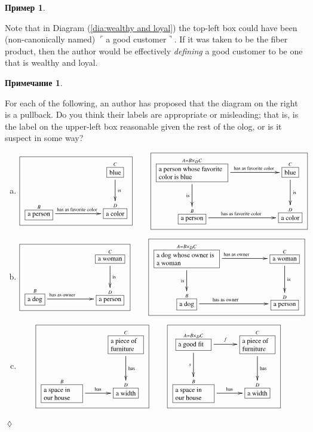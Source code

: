 \documentclass[a4paper]{book}
\def\tn{\textnormal}
\def\hsp{\hspace{.3in}}
\def\rr{\raggedright}
\newcommand{\LA}[2]{\ar[#1]^-{\tn {#2}}}
\newcommand{\LAL}[2]{\ar[#1]_-{\tn {#2}}}
\newcommand{\obox}[3]{\stackrel{#1}{\fbox{\parbox{#2}{#3}}}}
\newcommand{\smbox}[2]{\stackrel{#1}{\fbox{#2}}}
\newcommand{\fakebox}[1]{\tn{$\ulcorner$#1$\urcorner$}}
\theoremstyle{myth}
\newtheorem{remarkENG}[envENG]{\begin{english}Remark\end{english}}
\newtheorem{excENG}[envENG]{\begin{english}Exercise\end{english}}
\newenvironment{exerciseENG}{\begin{excENG}}{\hspace*{\fill}$\lozenge$\end{excENG}}
\newtheorem{remarkRUS}[envRUS]{Примечание}
\newtheorem{exampleRUS}[envRUS]{Пример}
\def\sexc{\begin{enumerate}[a.)]\setlength{\itemsep}{.1cm}\setlength{\parskip}{.1cm}\item}
\def\next{\item}
\def\endsexc{\end{enumerate}}
\begin{document}
\begin{russian}
\begin{exampleRUS}
 
\end{exampleRUS}

\begin{remarkENG}\label{rem:defining using pullbacks}
Note that in Diagram (\ref{dia:wealthy and loyal}) the top-left box could have been (non-canonically named) \fakebox{a good customer}. If it was taken to be the fiber product, then the author would be effectively {\em defining} a good customer to be one that is wealthy and loyal. 
\end{remarkENG}

\begin{remarkRUS}\label{rem:defining using pullbacks}
 
\end{remarkRUS}

\begin{exerciseENG}
For each of the following, an author has proposed that the diagram on the right is a pullback. Do you think their labels are appropriate or misleading; that is, is the label on the upper-left box reasonable given the rest of the olog, or is it suspect in some way?
\sexc\begin{align*}\footnotesize\fbox{\xymatrix{&&\smbox{C}{blue}\LA{d}{is}\\\smbox{B}{a person}\LA{rr}{\parbox{.7in}{\rr has as favorite color}}&&\smbox{D}{a color}}}\hsp&\footnotesize\fbox{\xymatrixnocompile{\obox{A=B\times_DC}{1.1in}{\rr a person whose favorite color is blue}\LAL{d}{is}\LA{rr}{\parbox{.7in}{\rr has as favorite color}}&&\smbox{C}{blue}\LA{d}{is}\\\smbox{B}{a person}\LA{rr}{\parbox{.7in}{\rr has as favorite color}}&&\smbox{D}{a color}}}
\end{align*}
\next\begin{align*}\footnotesize\fbox{\xymatrixnocompile{&&\smbox{C}{a woman}\LA{d}{is}\\\smbox{B}{a dog}\LA{rr}{\parbox{.7in}{\rr has as owner}}&&\smbox{D}{a person}}}\hsp&\footnotesize\fbox{\xymatrixnocompile{\obox{A=B\times_DC}{1in}{\rr a dog whose owner is a woman}\LAL{d}{is}\LA{rr}{\parbox{.7in}{\rr has as owner}}&&\smbox{C}{a woman}\LA{d}{is}\\\smbox{B}{a dog}\LA{rr}{\parbox{.7in}{\rr has as owner}}&&\smbox{D}{a person}}}
\end{align*}
\next\begin{align*}\footnotesize\fbox{\xymatrixnocompile{&\obox{C}{.5in}{\rr a piece of furniture}\LA{d}{has}\\\obox{B}{.6in}{\rr a space in our house}\LA{r}{has}&\smbox{D}{a width}}}\hsp&\footnotesize\fbox{\xymatrixnocompile{\obox{A=B\times_DC}{.5in}{\rr a good fit}\LAL{d}{$s$}\LA{r}{$f$}&\obox{C}{.5in}{\rr a piece of furniture}\LA{d}{has}\\\obox{B}{.6in}{\rr a space in our house}\LA{r}{has}&\smbox{D}{a width}}}
\end{align*}
\endsexc
\end{exerciseENG}


\end{russian}
\end{document}
